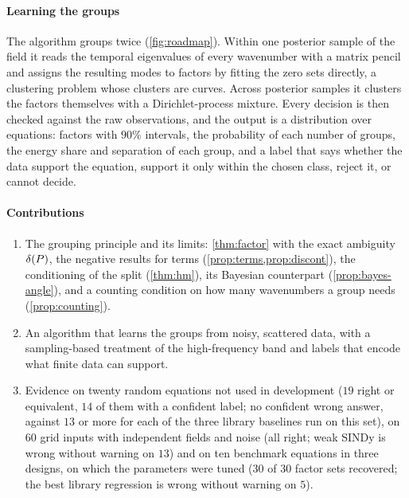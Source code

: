 \paragraph{Learning the groups} The algorithm groups twice (\cref{fig:roadmap}). Within one posterior sample of the field
it reads the temporal eigenvalues of every wavenumber with a matrix pencil and assigns the resulting modes to factors by
fitting the zero sets directly, a clustering problem whose clusters are curves. Across posterior samples it clusters the
factors themselves with a Dirichlet-process mixture. Every decision is then checked against the raw observations, and
the output is a distribution over equations: factors with $90\%$ intervals, the probability of each number of groups,
the energy share and separation of each group, and a label that says whether the data support the equation, support
it only within the chosen class, reject it, or cannot decide.

\paragraph{Contributions}
\begin{enumerate}
  \item The grouping principle and its limits: \cref{thm:factor} with the exact ambiguity $\delta(P)$, the negative results
  for terms (\cref{prop:terms,prop:discont}), the conditioning of the split (\cref{thm:hm}), its Bayesian counterpart
  (\cref{prop:bayes-angle}), and a counting condition on how many wavenumbers a group needs (\cref{prop:counting}).
  \item An algorithm that learns the groups from noisy, scattered data, with a sampling-based treatment of the
  high-frequency band and labels that encode what finite data can support.
  \item Evidence on twenty random equations not used in development ($19$ right or equivalent, $14$ of them with a confident
  label; no confident wrong answer, against $13$ or more for each of the three library baselines run on this set), on
  $60$ grid inputs with independent fields and noise (all right; weak SINDy is wrong without warning on $13$) and on ten benchmark equations in three designs, on which the
  parameters were tuned ($30$ of $30$ factor sets recovered; the best library regression is wrong without warning on $5$).
\end{enumerate}




